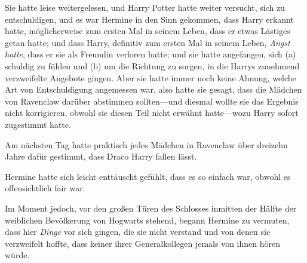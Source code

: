 Sie hatte leise weitergelesen, und Harry Potter hatte weiter versucht, sich zu entschuldigen, und es war Hermine in den Sinn gekommen, dass Harry erkannt hatte, möglicherweise zum ersten Mal in seinem Leben, dass er etwas Lästiges getan hatte; und dass Harry, definitiv zum ersten Mal in seinem Leben, \emph{Angst hatte}, dass er sie als Freundin verloren hatte; und sie hatte angefangen, sich (a) schuldig zu fühlen und (b) um die Richtung zu sorgen, in die Harrys zunehmend verzweifelte Angebote gingen. Aber sie hatte immer noch keine Ahnung, welche Art von Entschuldigung angemessen war, also hatte sie gesagt, dass die Mädchen von Ravenclaw darüber abstimmen sollten—und diesmal wollte sie das Ergebnis nicht korrigieren, obwohl sie diesen Teil nicht erwähnt hatte—wozu Harry sofort zugestimmt hatte.

Am nächsten Tag hatte praktisch jedes Mädchen in Ravenclaw über dreizehn Jahre dafür gestimmt, dass Draco Harry fallen lässt.

Hermine hatte sich leicht enttäuscht gefühlt, dass es so einfach war, obwohl es offensichtlich fair war.

Im Moment jedoch, vor den großen Türen des Schlosses inmitten der Hälfte der weiblichen Bevölkerung von Hogwarts stehend, begann Hermine zu vermuten, dass hier \emph{Dinge} vor sich gingen, die sie nicht verstand und von denen sie verzweifelt hoffte, dass keiner ihrer Generalkollegen jemals von ihnen hören würde.

